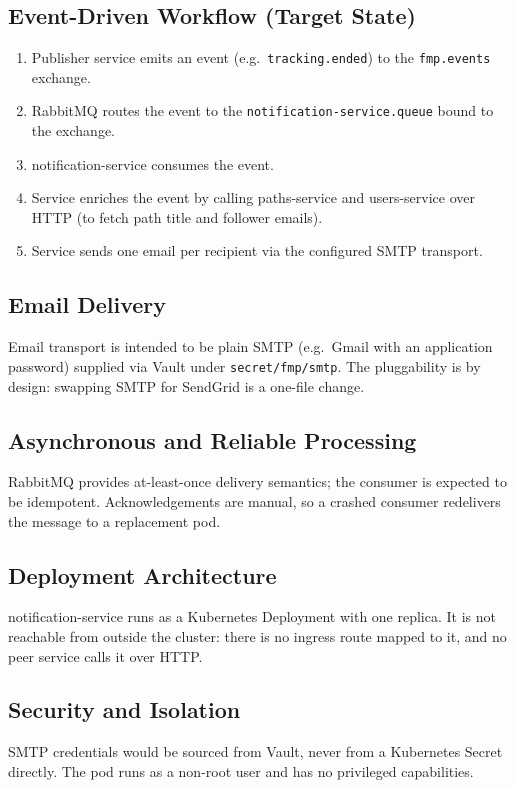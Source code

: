 \documentclass[11pt,a4paper]{article}
\begin{document}
\subsection{Event-Driven Workflow (Target State)}
\begin{enumerate}[leftmargin=*]
  \item Publisher service emits an event (e.g.\
        \texttt{tracking.ended}) to the \texttt{fmp.events}
        exchange.
  \item RabbitMQ routes the event to the
        \texttt{notification-service.queue} bound to the exchange.
  \item notification-service consumes the event.
  \item Service enriches the event by calling paths-service and
        users-service over HTTP (to fetch path title and follower
        emails).
  \item Service sends one email per recipient via the configured
        SMTP transport.
\end{enumerate}

\subsection{Email Delivery}
Email transport is intended to be plain SMTP (e.g.\ Gmail with an
application password) supplied via Vault under
\texttt{secret/fmp/smtp}.  The pluggability is by design: swapping
SMTP for SendGrid is a one-file change.

\subsection{Asynchronous and Reliable Processing}
RabbitMQ provides at-least-once delivery semantics; the consumer is
expected to be idempotent.  Acknowledgements are manual, so a crashed
consumer redelivers the message to a replacement pod.

\subsection{Deployment Architecture}
notification-service runs as a Kubernetes Deployment with one replica.
It is not reachable from outside the cluster: there is no ingress
route mapped to it, and no peer service calls it over HTTP.

\subsection{Security and Isolation}
SMTP credentials would be sourced from Vault, never from a Kubernetes
Secret directly.  The pod runs as a non-root user and has no
privileged capabilities.
\end{document}
